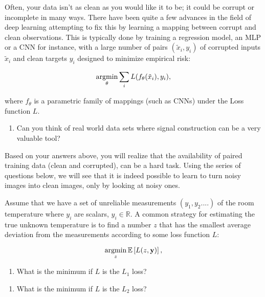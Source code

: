 
Often, your data isn't as clean as you would like it to be; it could be corrupt or incomplete in many ways. There have been quite a few advances in the field of deep learning attempting to fix this by learning a mapping between corrupt and clean observations. 
This is typically done by training a regression model, an MLP or a CNN for instance, with a large number of pairs $(\tilde{x}_{i},y_i)$ of corrupted inputs $\tilde{x}_{i}$ and clean targets $y_i$ designed to minimize empirical risk:

\begin{equation}
\mathop{\mathrm{argmin}}_{\theta} \sum_{i} L(f_{\theta}(\tilde{x}_{i}), y_i),
\end{equation}

where $f_{\theta}$ is a parametric family of mappings (such as CNNs) under the Loss function $L$.

\begin{enumerate}
\item Can you think of real world data sets where signal construction can be a very valuable tool?
\end{enumerate}

Based on your answers above, you will realize that the availability of paired training data (clean and corrupted), can be a hard task. Using the series of questions below, we will see that it is indeed possible to learn to turn noisy images into clean images, only by looking at noisy ones. 

Assume that we have a set of unreliable measurements $(y_1, y_2....)$ of the room temperature where $y_i$ are scalars, $y_i \in \mathbb{R}$.  A common strategy
for estimating the true unknown temperature is to find a
number $z$ that has the smallest average deviation from the
measurements according to some loss function $L$:

\begin{equation}
\mathop{\mathrm{argmin}}_{z} \mathbb{E} \left[L(z, \mathbf{y})\right],
\end{equation}

\begin{enumerate}[resume]
\item What is the minimum if $L$ is the $L_1$ loss?
\end{enumerate}

\begin{enumerate}[resume]
\item What is the minimum if $L$ is the $L_2$ loss?
\end{enumerate}

